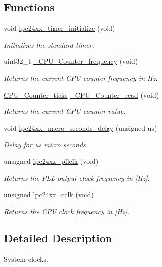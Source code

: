 \subsection*{Functions}
\begin{DoxyCompactItemize}
\item 
void \mbox{\hyperlink{group__lpc24xx__clock_gab3adf1ba12bf721c8229c9f473099d87}{lpc24xx\+\_\+timer\+\_\+initialize}} (void)
\begin{DoxyCompactList}\small\item\em Initializes the standard timer. \end{DoxyCompactList}\item 
uint32\+\_\+t \mbox{\hyperlink{group__RTEMSScoreCPUARM_gaa675150e5d00169c99410a82011b6117}{\+\_\+\+C\+P\+U\+\_\+\+Counter\+\_\+frequency}} (void)
\begin{DoxyCompactList}\small\item\em Returns the current C\+PU counter frequency in Hz. \end{DoxyCompactList}\item 
\mbox{\hyperlink{no__cpu_2include_2rtems_2score_2cpu_8h_a67f8550aad58bccb6fcb4589894444ad}{C\+P\+U\+\_\+\+Counter\+\_\+ticks}} \mbox{\hyperlink{group__RTEMSScoreCPUARM_gac016ae4ed92ed2607bd65408a36d908b}{\+\_\+\+C\+P\+U\+\_\+\+Counter\+\_\+read}} (void)
\begin{DoxyCompactList}\small\item\em Returns the current C\+PU counter value. \end{DoxyCompactList}\item 
void \mbox{\hyperlink{group__lpc24xx__clock_gac1fffb9076567b431b33ef1028873a78}{lpc24xx\+\_\+micro\+\_\+seconds\+\_\+delay}} (unsigned us)
\begin{DoxyCompactList}\small\item\em Delay for {\itshape us} micro seconds. \end{DoxyCompactList}\item 
unsigned \mbox{\hyperlink{group__lpc24xx__clock_ga985f11224a9ca5c881d6a7da40eb1b97}{lpc24xx\+\_\+pllclk}} (void)
\begin{DoxyCompactList}\small\item\em Returns the P\+LL output clock frequency in \mbox{[}Hz\mbox{]}. \end{DoxyCompactList}\item 
unsigned \mbox{\hyperlink{group__lpc24xx__clock_ga1f89dbcdb26c1d4fe517abf6691f3a91}{lpc24xx\+\_\+cclk}} (void)
\begin{DoxyCompactList}\small\item\em Returns the C\+PU clock frequency in \mbox{[}Hz\mbox{]}. \end{DoxyCompactList}\end{DoxyCompactItemize}


\subsection{Detailed Description}
System clocks. 

